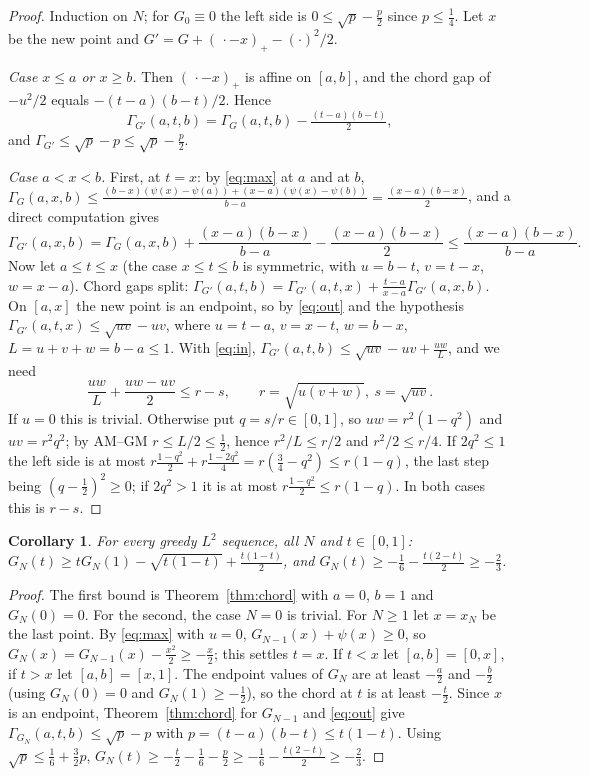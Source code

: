 \documentclass[11pt]{amsart}
\newtheorem{corollary}[theorem]{Corollary}
\theoremstyle{remark}
\begin{document}
\begin{proof}
Induction on $N$; for $G_0\equiv0$ the left side is $0\le\sqrt p-\frac p2$
since $p\le\frac14$. Let $x$ be the new point and
$G'=G+(\,\cdot-x)_+-(\cdot)^2/2$.

\emph{Case $x\le a$ or $x\ge b$.} Then $(\,\cdot-x)_+$ is affine on $[a,b]$,
and the chord gap of $-u^2/2$ equals $-(t-a)(b-t)/2$. Hence
\begin{equation}\label{eq:out}
\Gamma_{G'}(a,t,b)=\Gamma_G(a,t,b)-\tfrac{(t-a)(b-t)}{2},
\end{equation}
and $\Gamma_{G'}\le\sqrt p-p\le\sqrt p-\frac p2$.

\emph{Case $a<x<b$.} First, at $t=x$: by \eqref{eq:max} at $a$ and at $b$,
$\Gamma_G(a,x,b)\le\frac{(b-x)(\psi(x)-\psi(a))+(x-a)(\psi(x)-\psi(b))}{b-a}=\frac{(x-a)(b-x)}{2}$,
and a direct computation gives
\begin{equation}\label{eq:in}
\Gamma_{G'}(a,x,b)=\Gamma_G(a,x,b)+\frac{(x-a)(b-x)}{b-a}-\frac{(x-a)(b-x)}{2}
\le\frac{(x-a)(b-x)}{b-a}.
\end{equation}
Now let $a\le t\le x$ (the case $x\le t\le b$ is symmetric, with
$u=b-t$, $v=t-x$, $w=x-a$). Chord gaps split:
$\Gamma_{G'}(a,t,b)=\Gamma_{G'}(a,t,x)+\frac{t-a}{x-a}\Gamma_{G'}(a,x,b)$. On
$[a,x]$ the new point is an endpoint, so by \eqref{eq:out} and the hypothesis
$\Gamma_{G'}(a,t,x)\le\sqrt{uv}-uv$, where $u=t-a$, $v=x-t$, $w=b-x$,
$L=u+v+w=b-a\le1$. With \eqref{eq:in},
$\Gamma_{G'}(a,t,b)\le\sqrt{uv}-uv+\frac{uw}{L}$, and we need
\[
\frac{uw}{L}+\frac{uw-uv}{2}\le r-s,\qquad r=\sqrt{u(v+w)},\ s=\sqrt{uv}.
\]
If $u=0$ this is trivial. Otherwise put $q=s/r\in[0,1]$, so $uw=r^2(1-q^2)$ and
$uv=r^2q^2$; by AM--GM $r\le L/2\le\frac12$, hence $r^2/L\le r/2$ and
$r^2/2\le r/4$. If $2q^2\le1$ the left side is at most
$r\frac{1-q^2}{2}+r\frac{1-2q^2}{4}=r(\tfrac34-q^2)\le r(1-q)$, the last step
being $(q-\tfrac12)^2\ge0$; if $2q^2>1$ it is at most
$r\frac{1-q^2}{2}\le r(1-q)$. In both cases this is $r-s$.
\end{proof}

\begin{corollary}\label{cor:lower}
For every greedy $L^2$ sequence, all $N$ and $t\in[0,1]$:
$G_N(t)\ge tG_N(1)-\sqrt{t(1-t)}+\frac{t(1-t)}{2}$, and
$G_N(t)\ge-\frac16-\frac{t(2-t)}{2}\ge-\frac23$.
\end{corollary}

\begin{proof}
The first bound is Theorem~\ref{thm:chord} with $a=0$, $b=1$ and $G_N(0)=0$.
For the second, the case $N=0$ is trivial. For $N\ge1$ let $x=x_N$ be the last
point. By \eqref{eq:max} with $u=0$, $G_{N-1}(x)+\psi(x)\ge0$, so
$G_N(x)=G_{N-1}(x)-\frac{x^2}{2}\ge-\frac x2$; this settles $t=x$. If $t<x$ let
$[a,b]=[0,x]$, if $t>x$ let $[a,b]=[x,1]$. The endpoint values of $G_N$ are at
least $-\frac a2$ and $-\frac b2$ (using $G_N(0)=0$ and $G_N(1)\ge-\frac12$), so
the chord at $t$ is at least $-\frac t2$. Since $x$ is an endpoint,
Theorem~\ref{thm:chord} for $G_{N-1}$ and \eqref{eq:out} give
$\Gamma_{G_N}(a,t,b)\le\sqrt p-p$ with $p=(t-a)(b-t)\le t(1-t)$. Using
$\sqrt p\le\frac16+\frac32p$,
$G_N(t)\ge-\frac t2-\frac16-\frac p2\ge-\frac16-\frac{t(2-t)}{2}\ge-\frac23$.
\end{proof}
\end{document}
